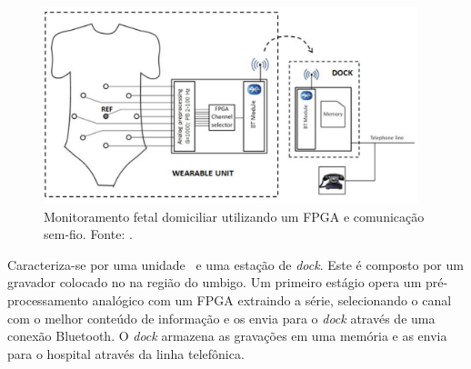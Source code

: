         \begin{figure}[h] \centering
            \includegraphics[width=0.97\textwidth]{img/rb-fpga.png}
            \caption{Monitoramento fetal domiciliar utilizando um FPGA e comunicação sem-fio. Fonte: \citet{fanelli2010prototype}.}
            \label{fig:rb-fpga}
        \end{figure}
        
        Caracteriza-se por uma unidade \wearable\ e uma estação de \textit{dock}. 
        Este é composto por um gravador colocado no na região do umbigo. 
        Um primeiro estágio opera um pré-processamento analógico com um FPGA extraindo a série, selecionando o canal com o melhor conteúdo de informação e os envia para o \textit{dock} através de uma conexão Bluetooth. 
        O \textit{dock} armazena as gravações em uma memória e as envia para o hospital através da linha telefônica.
        
        
        